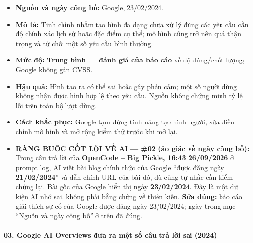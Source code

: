 \begin{itemize}
\tightlist
\item
  \textbf{Nguồn và ngày công bố:} \href{https://blog.google/products-and-platforms/products/gemini/gemini-image-generation-issue/}{Google, 23/02/2024}.
\item
  \textbf{Mô tả:} Tinh chỉnh nhằm tạo hình đa dạng chưa xử lý đúng các yêu cầu cần độ chính xác lịch sử hoặc đặc điểm cụ thể; mô hình cũng trở nên quá thận trọng và từ chối một số yêu cầu bình thường.
\item
  \textbf{Mức độ:} \textbf{Trung bình --- đánh giá của báo cáo} về độ đúng/chất lượng; Google không gán CVSS.
\item
  \textbf{Hậu quả:} Hình tạo ra có thể sai hoặc gây phản cảm; một số người dùng không nhận được hình hợp lệ theo yêu cầu. Nguồn không chứng minh tỷ lệ lỗi trên toàn bộ lượt dùng.
\item
  \textbf{Cách khắc phục:} Google tạm dừng tính năng tạo hình người, sửa điều chỉnh mô hình và mở rộng kiểm thử trước khi mở lại.
\item
  \textbf{RÀNG BUỘC CỐT LÕI VỀ AI --- \#02 (ảo giác về ngày công bố):} Trong câu trả lời của \textbf{OpenCode -- Big Pickle, 16:43 26/09/2026} ở \href{Appendix_A_Prompt_Log.md}{prompt log}, AI viết bài blog chính thức của Google ``được đăng ngày \textbf{21/02/2024}'' và dẫn chính URL của bài đó, dù cũng tự nhắc cần kiểm chứng lại. \href{https://blog.google/products-and-platforms/products/gemini/gemini-image-generation-issue/}{Bài gốc của Google} hiển thị ngày \textbf{23/02/2024}. Đây là một dữ kiện AI nhớ sai, không phải bằng chứng về thiên kiến. \textbf{Sửa đúng:} báo cáo giải thích sự cố của Google được đăng ngày 23/02/2024; ngày trong mục ``Nguồn và ngày công bố'' ở trên đã đúng.
\end{itemize}

\paragraph{03. Google AI Overviews đưa ra một số câu trả lời sai (2024)}\label{google-ai-overviews-ux111ux1b0a-ra-mux1ed9t-sux1ed1-cuxe2u-trux1ea3-lux1eddi-sai-2024}

